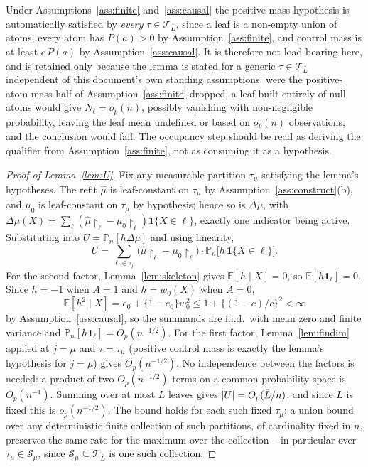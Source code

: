 \documentclass[11pt]{article}
\theoremstyle{plain}
\theoremstyle{definition}
\theoremstyle{remark}
\newcommand{\E}{\mathbb{E}}
\newcommand{\Pn}{\mathbb{P}_n}
\newcommand{\cT}{\mathcal{T}}
\newcommand{\cS}{\mathcal{S}}
\newcommand{\ez}{e_0}
\newcommand{\mz}{\mu_0}
\newcommand{\wz}{w_0}
\newcommand{\mhat}{\widehat{\mu}}
\DeclarePairedDelimiter{\abs}{\lvert}{\rvert}
\begin{document}
\noindent Under Assumptions~\ref{ass:finite} and~\ref{ass:causal} the positive-mass
hypothesis is automatically satisfied by \emph{every} $\tau\in\cT_{\bar L}$, since a
leaf is a non-empty union of atoms, every atom has $P(a)>0$ by
Assumption~\ref{ass:finite}, and control mass is at least $c\,P(a)$ by
Assumption~\ref{ass:causal}. It is therefore not load-bearing here, and is
retained only because the lemma is stated for a generic $\tau\in\cT_{\bar L}$
independent of this document's own standing assumptions: were the
positive-atom-mass half of Assumption~\ref{ass:finite} dropped, a leaf built
entirely of null atoms would give $N_\ell=o_p(n)$, possibly vanishing with
non-negligible probability, leaving the leaf mean undefined or based on
$o_p(n)$ observations, and the conclusion would fail. The occupancy step
should be read as deriving the qualifier from Assumption~\ref{ass:finite},
not as consuming it as a hypothesis.

\begin{proof}[Proof of Lemma~\ref{lem:U}]
Fix any measurable partition $\tau_\mu$ satisfying the lemma's hypotheses.
The refit $\mhat$ is leaf-constant on $\tau_\mu$ by
Assumption~\ref{ass:construct}(b), and $\mz$ is leaf-constant on $\tau_\mu$ by
hypothesis; hence so is $\Delta\mu$, with
$\Delta\mu(X)=\sum_{\ell}(\mhat\restriction_\ell-\mz\restriction_\ell)
\mathbf1\{X\in\ell\}$, exactly one indicator being active. Substituting into
$U=\Pn[h\Delta\mu]$ and using linearity,
\[
  U=\sum_{\ell\in\tau_\mu}
   \bigl(\mhat\restriction_\ell-\mz\restriction_\ell\bigr)\cdot
   \Pn\bigl[h\,\mathbf1\{X\in\ell\}\bigr].
\]
For the second factor, Lemma~\ref{lem:skeleton} gives $\E[h\mid X]=0$, so
$\E[h\mathbf1_\ell]=0$. Since $h=-1$ when $A=1$ and $h=\wz(X)$ when $A=0$,
\[
  \E[h^2\mid X]=\ez+\{1-\ez\}\wz^2\le1+\bigl\{(1-c)/c\bigr\}^2<\infty
\]
by Assumption~\ref{ass:causal}, so the summands are i.i.d.\ with mean zero and
finite variance and $\Pn[h\mathbf1_\ell]=O_p(n^{-1/2})$. For the first factor,
Lemma~\ref{lem:findim} applied at $j=\mu$ and $\tau=\tau_\mu$ (positive
control mass is exactly the lemma's hypothesis for $j=\mu$) gives
$O_p(n^{-1/2})$. No independence between the factors is needed: a product of
two $O_p(n^{-1/2})$ terms on a common probability space is $O_p(n^{-1})$.
Summing over at most $\bar L$ leaves gives $\abs U=O_p(\bar L/n)$, and since
$\bar L$ is fixed this is $o_p(n^{-1/2})$. The bound holds for each such
fixed $\tau_\mu$; a union bound over any deterministic finite collection of
such partitions, of cardinality fixed in $n$, preserves the same rate for the
maximum over the collection -- in particular over $\tau_\mu\in\cS_\mu$, since
$\cS_\mu\subseteq\cT_{\bar L}$ is one such collection.
\end{proof}
\end{document}

